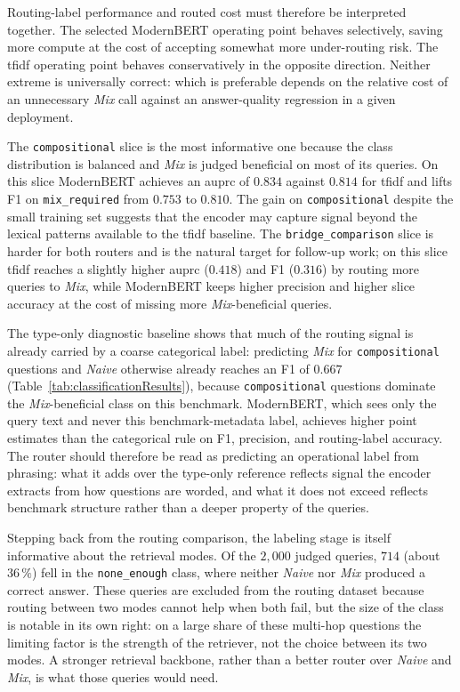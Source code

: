 \documentclass[english, bibtex]{kththesis}               %
\numberwithin{listing}{chapter}
\begin{document}
Routing-label performance and routed cost must therefore be interpreted together. The selected ModernBERT operating point behaves selectively, saving more compute at the cost of accepting somewhat more under-routing risk. The \gls{tfidf} operating point behaves conservatively in the opposite direction. Neither extreme is universally correct: which is preferable depends on the relative cost of an unnecessary \emph{Mix} call against an answer-quality regression in a given deployment.

The \texttt{compositional} slice is the most informative one because the class distribution is balanced and \emph{Mix} is judged beneficial on most of its queries. On this slice ModernBERT achieves an \gls{auprc} of $0.834$ against $0.814$ for \gls{tfidf} and lifts F1 on \texttt{mix\_required} from $0.753$ to $0.810$. The gain on \texttt{compositional} despite the small training set suggests that the encoder may capture signal beyond the lexical patterns available to the \gls{tfidf} baseline. The \texttt{bridge\_comparison} slice is harder for both routers and is the natural target for follow-up work; on this slice \gls{tfidf} reaches a slightly higher \gls{auprc} ($0.418$) and F1 ($0.316$) by routing more queries to \emph{Mix}, while ModernBERT keeps higher precision and higher slice accuracy at the cost of missing more \emph{Mix}-beneficial queries.

The type-only diagnostic baseline shows that much of the routing signal is already carried by a coarse categorical label: predicting \emph{Mix} for \texttt{compositional} questions and \emph{Naive} otherwise already reaches an F1 of $0.667$ (Table~\ref{tab:classificationResults}), because \texttt{compositional} questions dominate the \emph{Mix}-beneficial class on this benchmark. ModernBERT, which sees only the query text and never this benchmark-metadata label, achieves higher point estimates than the categorical rule on F1, precision, and routing-label accuracy. The router should therefore be read as predicting an operational label from phrasing: what it adds over the type-only reference reflects signal the encoder extracts from how questions are worded, and what it does not exceed reflects benchmark structure rather than a deeper property of the queries.

Stepping back from the routing comparison, the labeling stage is itself informative about the retrieval modes. Of the $2{,}000$ judged queries, $714$ (about $36\,\%$) fell in the \texttt{none\_enough} class, where neither \emph{Naive} nor \emph{Mix} produced a correct answer. These queries are excluded from the routing dataset because routing between two modes cannot help when both fail, but the size of the class is notable in its own right: on a large share of these multi-hop questions the limiting factor is the strength of the retriever, not the choice between its two modes. A stronger retrieval backbone, rather than a better router over \emph{Naive} and \emph{Mix}, is what those queries would need.
\end{document}
